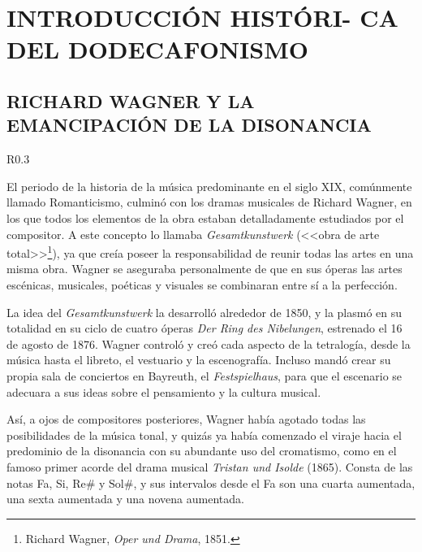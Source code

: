 	\chapter[INTRODUCCIÓN HISTÓRICA DEL DODECAFONISMO]{INTRODUCCIÓN HISTÓRI- CA DEL DODECAFONISMO}
	\section[R. WAGNER Y LA EMANCIPACIÓN DE LA DISONANCIA]{RICHARD WAGNER Y LA EMANCIPACIÓN DE LA DISONANCIA}
		\begin{wrapfigure}{R}{0.3\textwidth}
			\captionsetup{justification=centering, font=footnotesize}
			\vspace{-0.5cm}
		\end{wrapfigure}
		El periodo de la historia de la música predominante en el siglo XIX, comúnmente llamado Romanticismo, culminó con los dramas musicales de Richard Wagner, en los que todos los elementos de la obra estaban detalladamente estudiados por el compositor. A este concepto lo llamaba \emph{Gesamtkunstwerk} (<<obra de arte total>>\footnote{Richard Wagner, \emph{Oper und Drama}, 1851.}), ya que creía poseer la responsabilidad de reunir todas las artes en una misma obra. Wagner se aseguraba personalmente de que en sus óperas las artes escénicas, musicales, poéticas y visuales se combinaran entre sí a la perfección.
	
		La idea del \emph{Gesamtkunstwerk} la desarrolló alrededor de 1850, y la plasmó en su totalidad en su ciclo de cuatro óperas \emph{Der Ring des Nibelungen}, estrenado el 16 de agosto de 1876. Wagner controló y creó cada aspecto de la tetralogía, desde la música hasta el libreto, el vestuario y la escenografía. Incluso mandó crear su propia sala de conciertos en Bayreuth, el \emph{Festspielhaus}, para que el escenario se adecuara a sus ideas sobre el pensamiento y la cultura musical.
	
		Así, a ojos de compositores posteriores, Wagner había agotado todas las posibilidades de la música tonal, y quizás ya había comenzado el viraje hacia el predominio de la disonancia con su abundante uso del cromatismo, como en el famoso primer acorde del drama musical \emph{Tristan und Isolde} (1865). Consta de las notas Fa, Si, $\text{Re\#}$ y $\text{Sol\#}$, y sus intervalos desde el Fa son una cuarta aumentada, una sexta aumentada y una novena aumentada.
		
